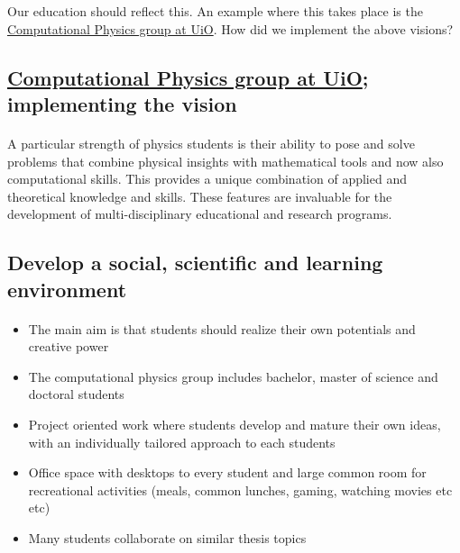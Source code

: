\documentclass[%
oneside,                 %
final,                   %
10pt]{article}
\begin{document}
\noindent
Our education should reflect this. An example where this takes place is the \href{{http://www.mn.uio.no/fysikk/english/research/groups/computational/index.html}}{Computational Physics group at UiO}.  How did we implement the above visions?




\subsection*{\href{{http://www.mn.uio.no/fysikk/english/research/groups/computational/index.html}}{Computational Physics group at UiO}; implementing the vision}

\paragraph{}
A particular strength of physics students is their ability to pose and
solve problems that combine physical insights with mathematical tools
and now also computational skills. This provides a unique combination
of applied and theoretical knowledge and skills. These features are invaluable 
for the development of multi-disciplinary educational and research programs.




\subsection*{Develop a social, scientific and learning environment}

\paragraph{}
\begin{itemize}
\item The main aim is that students should realize their own potentials and creative power

\item The computational physics group includes bachelor, master of science and doctoral students

\item Project oriented work where students develop and mature their own ideas, with an individually tailored approach to each students

\item Office space with desktops to every student and large common room for recreational activities (meals, common lunches, gaming, watching movies etc etc)

\item Many students collaborate on similar  thesis topics
\end{itemize}
\end{document}
